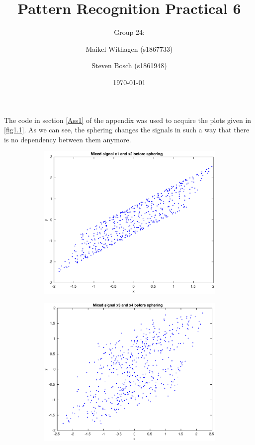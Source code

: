 \documentclass[10pt]{article}
\title{Pattern Recognition Practical 6}
\author{Group 24: \and Maikel Withagen (s1867733) \and Steven Bosch (s1861948)}
\date{\today}
\begin{document}
\maketitle

\section{}
\subsection{}
The code in section \ref{Ass1} of the appendix was used to acquire the plots given in \ref{fig1.1}. As we can see, the sphering changes the signals in such a way that there is no dependency between them anymore.

\begin{figure}
  \centering
  \caption{The mixed signals before and after whitening.}
	\begin{subfigure}[b]{.49\textwidth}
		\includegraphics[width=\columnwidth]{Ass1a.eps}
		\caption{}
		\label{fig1a}
	\end{subfigure}  
	\begin{subfigure}[b]{.49\textwidth}
		\includegraphics[width=\columnwidth]{Ass1b.eps}

\end{subfigure}
\end{figure}
\end{document}
